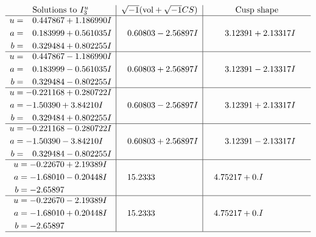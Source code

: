 \documentclass[1p]{elsarticle_modified}
\theoremstyle{definition}
\newcommand{\I}{\sqrt{-1}}
\begin{document}
$$\begin{array}{c|c|c}  
\text{Solutions to }I^u_{3}& \I (\text{vol} + \sqrt{-1}CS) & \text{Cusp shape}\\
 \hline 
\begin{aligned}
u &= \phantom{-}0.447867 + 1.186990 I \\
a &= \phantom{-}0.183999 + 0.561035 I \\
b &= \phantom{-}0.329484 + 0.802255 I\end{aligned}
 & \phantom{-}0.60803 - 2.56897 I & \phantom{-}3.12391 + 2.13317 I \\ \hline\begin{aligned}
u &= \phantom{-}0.447867 - 1.186990 I \\
a &= \phantom{-}0.183999 - 0.561035 I \\
b &= \phantom{-}0.329484 - 0.802255 I\end{aligned}
 & \phantom{-}0.60803 + 2.56897 I & \phantom{-}3.12391 - 2.13317 I \\ \hline\begin{aligned}
u &= -0.221168 + 0.280722 I \\
a &= -1.50390 + 3.84210 I \\
b &= \phantom{-}0.329484 + 0.802255 I\end{aligned}
 & \phantom{-}0.60803 - 2.56897 I & \phantom{-}3.12391 + 2.13317 I \\ \hline\begin{aligned}
u &= -0.221168 - 0.280722 I \\
a &= -1.50390 - 3.84210 I \\
b &= \phantom{-}0.329484 - 0.802255 I\end{aligned}
 & \phantom{-}0.60803 + 2.56897 I & \phantom{-}3.12391 - 2.13317 I \\ \hline\begin{aligned}
u &= -0.22670 + 2.19389 I \\
a &= -1.68010 - 0.20448 I \\
b &= -2.65897\phantom{ +0.000000I}\end{aligned}
 & \phantom{-}15.2333\phantom{ +0.000000I} & \phantom{-}4.75217 + 0. I\phantom{ +0.000000I} \\ \hline\begin{aligned}
u &= -0.22670 - 2.19389 I \\
a &= -1.68010 + 0.20448 I \\
b &= -2.65897\phantom{ +0.000000I}\end{aligned}
 & \phantom{-}15.2333\phantom{ +0.000000I} & \phantom{-}4.75217 + 0. I\phantom{ +0.000000I}\\
 \hline 
 \end{array}$$\newpage\newpage\renewcommand{\arraystretch}{1}
\end{document}
